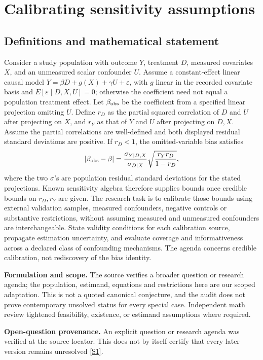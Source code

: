 \documentclass[11pt]{article}
\newcommand{\sref}[2]{\hyperlink{source:#1:#2}{[S#2]}}
\begin{document}
\section*{Calibrating sensitivity assumptions}\label{30007704}
\subsection{Definitions and mathematical statement}
Consider a study population with outcome \(Y\), treatment \(D\), measured covariates \(X\), and an unmeasured scalar confounder \(U\). Assume a constant-effect linear causal model \(Y=\beta D+g(X)+\gamma U+\varepsilon\), with \(g\) linear in the recorded covariate basis and \(E[\varepsilon\mid D,X,U]=0\); otherwise the coefficient need not equal a population treatment effect. Let \(\beta_{\rm obs}\) be the coefficient from a specified linear projection omitting \(U\). Define \(r_D\) as the partial squared correlation of \(D\) and \(U\) after projecting on \(X\), and \(r_Y\) as that of \(Y\) and \(U\) after projecting on \(D,X\). Assume the partial correlations are well-defined and both displayed residual standard deviations are positive. If \(r_D<1\), the omitted-variable bias satisfies
\[
|\beta_{\rm obs}-\beta|=\frac{\sigma_{Y\mid D,X}}{\sigma_{D\mid X}}\sqrt{\frac{r_Yr_D}{1-r_D}},
\]
where the two \(\sigma\)'s are population residual standard deviations for the stated projections. Known sensitivity algebra therefore supplies bounds once credible bounds on \(r_D,r_Y\) are given. The research task is to calibrate those bounds using external validation samples, measured confounders, negative controls or substantive restrictions, without assuming measured and unmeasured confounders are interchangeable. State validity conditions for each calibration source, propagate estimation uncertainty, and evaluate coverage and informativeness across a declared class of confounding mechanisms. The agenda concerns credible calibration, not rediscovery of the bias identity.

\par\textbf{Formulation and scope.} The source verifies a broader question or research agenda; the population, estimand, equations and restrictions here are our scoped adaptation. This is not a quoted canonical conjecture, and the audit does not prove contemporary unsolved status for every special case. Independent math review tightened feasibility, existence, or estimand assumptions where required.

\par\textbf{Open-question provenance.} An explicit question or research agenda was verified at the source locator. This does not by itself certify that every later version remains unresolved \sref{30007704}{1}.
\end{document}
